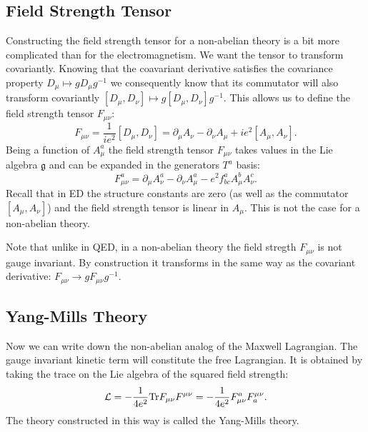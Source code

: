 \documentclass[11pt]{report}
\theoremstyle{plain}
\theoremstyle{definition}
\theoremstyle{remark}
\theoremstyle{remark}
\numberwithin{equation}{section}
\begin{document}
 
 
 \subsection{Field Strength Tensor}
 Constructing the field strength tensor for a non-abelian theory is a bit more complicated than for the electromagnetism. We want the tensor to transform covariantly. Knowing that the coavariant derivative satisfies the covariance property $D_{\mu} \mapsto gD_{\mu}g^{-1}$ we consequently know that its commutator will also transform covariantly $[D_{\mu}, D_{\nu}] \mapsto g[D_{\mu}, D_{\nu}]g^{-1}$. This allows us to define the field strength tensor $F_{\mu \nu}$:
 \begin{equation}
 F_{\mu \nu} = \frac{1}{i e^2} [D_{\mu}, D_{\nu}] = \partial_{\mu} A_{\nu} - \partial_{\nu} A_{\mu} + ie^2[A_{\mu}, A_{\nu}].
 \end{equation}
Being a function of $A^a_{\mu}$ the field strength tensor $F_{\mu \nu}$ takes values in the Lie algebra $\mathfrak{g}$ and can be expanded in the generators $T^a$ basis:
\begin{equation}
 F_{\mu \nu}^a = \partial_{\mu} A_{\nu}^a - \partial_{\nu} A_{\mu}^a - e^2 f^a_{bc}A_{\mu}^bA_{\nu}^c.
 \end{equation}
 Recall that in ED the structure constants are zero (as well as the commutator $[A_{\mu}, A_{\nu}]$) and the field strength tensor is linear in $A_{\mu}$. This is not the case for a non-abelian theory. 
 
 Note that unlike in QED, in a non-abelian theory the field stregth $F_{\mu \nu}$ is not gauge invariant. By construction it transforms in the same way as the covariant derivative: $F_{\mu \nu} \to gF_{\mu \nu}g^{-1}$.
 
 
 
 \subsection{Yang-Mills Theory}
 
 Now we can write down the non-abelian analog of the Maxwell Lagrangian. 
 The gauge invariant kinetic term will constitute the free Lagrangian. It is obtained by taking the trace on the Lie algebra of the squared field strength: 
 \begin{equation}
 \mathcal{L} = -\frac{1}{4e^2}{\rm Tr}F_{\mu \nu}F^{\mu \nu} = -\frac{1}{4e^2}F_{\mu \nu}^aF^{\mu \nu}_a.
 \end{equation} 
The theory constructed in this way is called the Yang-Mills theory.
 
\end{document}
